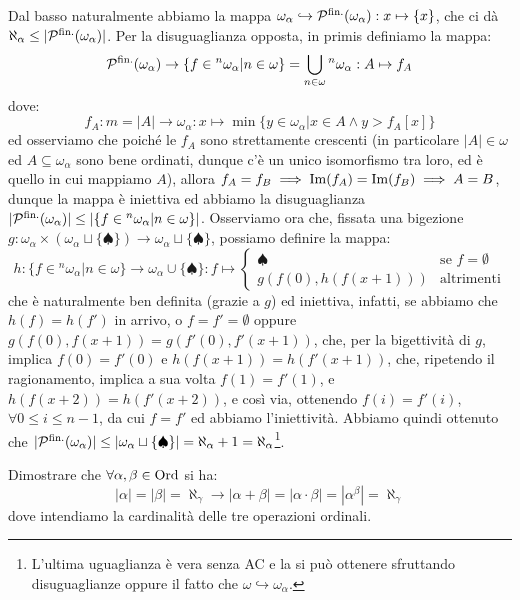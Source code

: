 \begin{soln}
	Dal basso naturalmente abbiamo la mappa $\omega_\alpha \hookrightarrow \mathcal{P}^{\text{fin.}}(\omega_\alpha) : x \mapsto \{x\}$, che ci d\`a $\aleph_\alpha \leq |\mathcal{P}^{\text{fin.}}(\omega_\alpha)|$. Per la disuguaglianza opposta, in primis definiamo la mappa:
	\[ \mathcal{P}^{\text{fin.}}(\omega_\alpha) \to \{f \in {}^n \omega_\alpha | n \in \omega\} = \bigcup_{n \in \omega} {}^n\omega_\alpha : A \mapsto f_A
		\]
	dove:
	\[ f_A : m = |A| \to \omega_\alpha : x \mapsto \min\{y \in \omega_\alpha | x \in  A \land y > f_A[x]\}
		\]
	ed osserviamo che poich\'e le $f_A$ sono strettamente crescenti (in particolare $|A| \in \omega$ ed $A \subseteq \omega_\alpha$ sono bene ordinati, dunque c'\`e un unico isomorfismo tra loro, ed \`e quello in cui mappiamo $A$),
	allora $f_A = f_B \implies \operatorname{Im}(f_A) = \operatorname{Im}(f_B) \implies A = B$, dunque la mappa \`e iniettiva ed abbiamo la disuguaglianza $|\mathcal{P}^{\text{fin.}}(\omega_\alpha)| \leq |\{f \in {}^n \omega_\alpha | n \in \omega\}|$. Osserviamo ora che, fissata una
	bigezione $g : \omega_\alpha \times (\omega_\alpha \sqcup \{\spadesuit\}) \to \omega_\alpha \sqcup \{\spadesuit\}$, possiamo definire la mappa:
	\[ h : \{f \in {}^n \omega_\alpha | n \in \omega\} \to \omega_\alpha \cup \{\spadesuit\} : f \mapsto \begin{cases}
		\spadesuit &\text{se $f = \emptyset$} \\
		g(f(0),h(f(x + 1))) &\text{altrimenti}
	\end{cases}
		\]
	che \`e naturalmente ben definita (grazie a $g$) ed iniettiva, infatti, se abbiamo che $h(f) = h(f')$ in arrivo, o $f = f' = \emptyset$ oppure $g(f(0),f(x+1)) = g(f'(0),f'(x+1))$, che, per la bigettivit\`a di $g$, implica $f(0) = f'(0)$ e $h(f(x+1)) = h(f'(x+1))$, che, ripetendo il ragionamento,
	implica a sua volta $f(1) = f'(1)$, e $h(f(x+2)) = h(f'(x+2))$, e cos\`i via, ottenendo $f(i) = f'(i)$, $\forall 0 \leq i \leq n-1$, da cui $f = f'$ ed abbiamo l'iniettivit\`a. Abbiamo quindi ottenuto che $|\mathcal{P}^{\text{fin.}}(\omega_\alpha)| \leq |\omega_\alpha \sqcup \{\spadesuit\}| = \aleph_\alpha + 1 = \aleph_\alpha$\footnote{L'ultima
	uguaglianza \`e vera senza AC e la si pu\`o ottenere sfruttando disuguaglianze oppure il fatto che $\omega \hookrightarrow \omega_\alpha$.}.
\end{soln}

\begin{exercise}
	Dimostrare che $\forall \alpha,\beta \in \operatorname{Ord}$ si ha:
	\[ |\alpha| = |\beta| = \aleph_\gamma \to |\alpha + \beta| = |\alpha \cdot \beta| = |\alpha^{\beta}| = \aleph_\gamma 
		\]
	dove intendiamo la cardinalit\`a delle tre operazioni ordinali.
\end{exercise}

